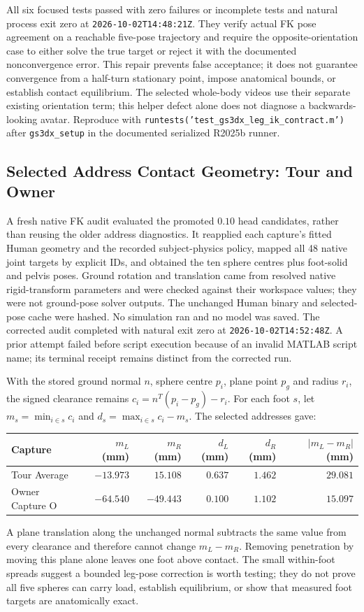 \documentclass[11pt,a4paper]{article}
\begin{document}
All six focused tests passed with zero failures or incomplete tests and
natural process exit zero at \texttt{2026-10-02T14:48:21Z}. They verify
actual FK pose agreement on a reachable five-pose trajectory and require
the opposite-orientation case to either solve the true target or reject it
with the documented nonconvergence error. This repair prevents false
acceptance; it does not guarantee convergence from a half-turn stationary
point, impose anatomical bounds, or establish contact equilibrium. The
selected whole-body videos use their separate existing orientation term;
this helper defect alone does not diagnose a backwards-looking avatar.
Reproduce with \texttt{runtests('test\_gs3dx\_leg\_ik\_contract.m')}
after \texttt{gs3dx\_setup} in the documented serialized R2025b runner.

\subsection{Selected Address Contact Geometry: Tour and Owner}
A fresh native FK audit evaluated the promoted $0.10$ head candidates,
rather than reusing the older address diagnostics. It reapplied each
capture's fitted Human geometry and the recorded subject-physics policy,
mapped all 48 native joint targets by explicit IDs, and obtained the ten
sphere centres plus foot-solid and pelvis poses. Ground rotation and
translation came from resolved native rigid-transform parameters and were
checked against their workspace values; they were not ground-pose solver
outputs. The unchanged Human binary and selected-pose cache were hashed.
No simulation ran and no model was saved. The corrected audit completed
with natural exit zero at \texttt{2026-10-02T14:52:48Z}. A prior attempt
failed before script execution because of an invalid MATLAB script name;
its terminal receipt remains distinct from the corrected run.

With the stored ground normal $n$, sphere centre $p_i$, plane point $p_g$
and radius $r_i$, the signed clearance remains
$c_i=n^{T}(p_i-p_g)-r_i$. For each foot $s$, let
$m_s=\min_{i\in s}c_i$ and
$d_s=\max_{i\in s}c_i-m_s$. The selected addresses gave:
\begin{center}
\begin{tabular}{lrrrrr}
\toprule
Capture & $m_L$ (mm) & $m_R$ (mm) & $d_L$ (mm) & $d_R$ (mm) & $|m_L-m_R|$ (mm) \\
\midrule
Tour Average & $-13.973$ & $15.108$ & $0.637$ & $1.462$ & $29.081$ \\
Owner Capture O & $-64.540$ & $-49.443$ & $0.100$ & $1.102$ & $15.097$ \\
\bottomrule
\end{tabular}
\end{center}
A plane translation along the unchanged normal subtracts the same value
from every clearance and therefore cannot change $m_L-m_R$. Removing
penetration by moving this plane alone leaves one foot above contact.
The small within-foot spreads suggest a bounded leg-pose correction is
worth testing; they do not prove all five spheres can carry load, establish
equilibrium, or show that measured foot targets are anatomically exact.
\end{document}
